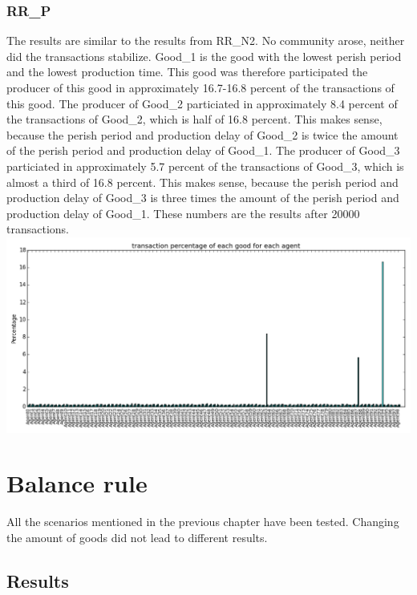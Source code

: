 \documentclass[twoside,openright]{uva-bachelor-thesis}
\begin{document}
\subsubsection{RR\_P}
The results are similar to the results from RR\_N2. No community arose, neither did the transactions stabilize. Good\_1 is the good with the lowest perish period and the lowest production time. This good was therefore participated the producer of this good in approximately 16.7-16.8 percent of the transactions of this good. The producer of Good\_2 particiated in approximately 8.4 percent of the transactions of Good\_2, which is half of 16.8 percent. This makes sense, because the perish period and production delay of Good\_2 is twice the amount of the perish period and production delay of Good\_1. The producer of Good\_3 particiated in approximately 5.7 percent of the transactions of Good\_3, which is almost a third of 16.8 percent. This makes sense, because the perish period and production delay of Good\_3 is three times the amount of the perish period and production delay of Good\_1. 
These numbers are the results after 20000 transactions. \\
\includegraphics[scale=0.4]{experiment_images/RR_P}

\section{Balance rule}
All the scenarios mentioned in the previous chapter have been tested. Changing the amount of goods did not lead to different results.
\subsection{Results}
\end{document}
